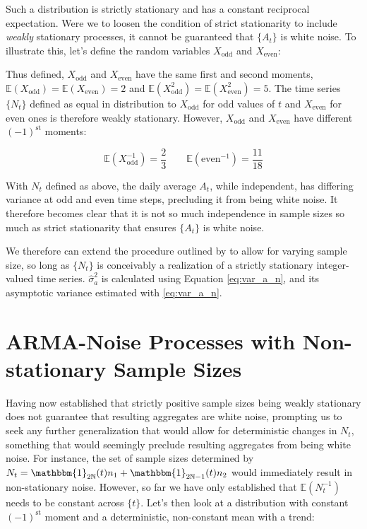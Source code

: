 \documentclass{TUT}
\numberwithin{equation}{section}
\theoremstyle{plain}
\begin{document}
Such a distribution is strictly stationary and has a constant reciprocal expectation. Were we to loosen the condition of strict stationarity to include \emph{weakly} stationary processes, it cannot be guaranteed that $\{A_t\}$ is white noise. To illustrate this, let's define the random variables $X_\text{odd}$ and $X_\text{even}$:



Thus defined, $X_\text{odd}$ and $X_\text{even}$ have the same first and second moments, $\mathbb{E}(X_\text{odd}) = \mathbb{E}(X_\text{even}) = 2$ and $\mathbb{E}(X_\text{odd}^2) = \mathbb{E}(X_\text{even}^2) = 5$. The time series $\{N_t\}$ defined as equal in distribution to $X_\text{odd}$ for odd values of $t$ and $X_\text{even}$ for even ones is therefore weakly stationary. However, $X_\text{odd}$ and $X_\text{even}$ have different $(-1)^\text{st}$ moments:

$$ \mathbb{E}(X_\text{odd}^{-1}) = \frac{2}{3}\qquad \mathbb{E}(\text{even}^{-1}) = \frac{11}{18} $$

With $N_t$ defined as above, the daily average $A_t$, while independent, has differing variance at odd and even time steps, precluding it from being white noise. It therefore becomes clear that it is not so much independence in sample sizes so much as strict stationarity that ensures $\{A_t\}$ is white noise.


We therefore can extend the procedure outlined by \citep{WongMiller1990} to allow for varying sample size, so long as $\{N_t\}$ is conceivably a realization of a strictly stationary integer-valued time series. $\hat{\sigma}_a^2$ is calculated using Equation \ref{eq:var_a_n}, and its asymptotic variance estimated with \ref{eq:var_a_n}.

\section{ARMA-Noise Processes with Non-stationary Sample Sizes}

Having now established that strictly positive sample sizes being weakly stationary does not guarantee that resulting aggregates are white noise, prompting us to seek any further generalization that would allow for  deterministic changes in $N_t$, something that would seemingly preclude resulting aggregates from being white noise. For instance, the set of sample sizes determined by $N_t = \mathbbm{1}_{2\mathbb{N}}(t)n_1 + \mathbbm{1}_{2\mathbb{N}-1}(t)n_2$ would immediately result in non-stationary noise. However, so far we have only established that $\mathbb{E}(N_t^{-1})$ needs to be constant across $\{t\}$. Let's then look at a distribution with constant $(-1)^\text{st}$ moment and a deterministic, non-constant mean with a trend:
\end{document}
